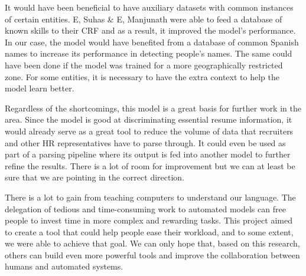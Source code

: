 \documentclass[a4paper, conference]{ieeeconf}
\begin{document}
  It would have been beneficial to have auxiliary datasets with common
  instances of certain entities. E, Suhas & E, Manjunath \cite{E*2020} were
  able to feed a database of known skills to their CRF and as a result, it
  improved the model's performance. In our case, the model would have benefited
  from a database of common Spanish names to increase its performance in
  detecting people's names. The same could have been done if the model was
  trained for a more geographically restricted zone. For some entities, it is
  necessary to have the extra context to help the model learn better.

  Regardless of the shortcomings, this model is a great basis for further work
  in the area. Since the model is good at discriminating essential resume
  information, it would already serve as a great tool to reduce the volume of
  data that recruiters and other HR representatives have to parse through. It
  could even be used as part of a parsing pipeline where its output is fed into
  another model to further refine the results. There is a lot of room for
  improvement but we can at least be sure that we are pointing in the correct
  direction.

  There is a lot to gain from teaching computers to understand our language.
  The delegation of tedious and time-consuming work to automated models can
  free people to invest time in more complex and rewarding tasks. This project
  aimed to create a tool that could help people ease their workload, and to
  some extent, we were able to achieve that goal. We can only hope that, based
  on this research, others can build even more powerful tools and improve the
  collaboration between humans and automated systems. 

  
  
\end{document}
